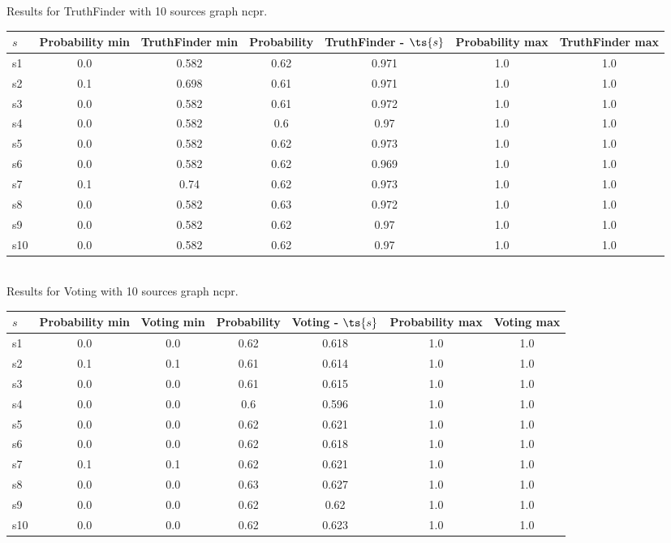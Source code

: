 \documentclass{article}
\begin{document}
\noindent Results for TruthFinder with 10 sources graph ncpr.

\noindent\begin{tabular}{|l|c|c|c|c|c|c|}
\hline
$s$& Probability min & TruthFinder min & Probability & TruthFinder - $\ts{s}$ & Probability max & TruthFinder max\\
\hline
s1 &0.0 & 0.582 & 0.62 & 0.971 & 1.0 & 1.0\\
\hline
s2 &0.1 & 0.698 & 0.61 & 0.971 & 1.0 & 1.0\\
\hline
s3 &0.0 & 0.582 & 0.61 & 0.972 & 1.0 & 1.0\\
\hline
s4 &0.0 & 0.582 & 0.6 & 0.97 & 1.0 & 1.0\\
\hline
s5 &0.0 & 0.582 & 0.62 & 0.973 & 1.0 & 1.0\\
\hline
s6 &0.0 & 0.582 & 0.62 & 0.969 & 1.0 & 1.0\\
\hline
s7 &0.1 & 0.74 & 0.62 & 0.973 & 1.0 & 1.0\\
\hline
s8 &0.0 & 0.582 & 0.63 & 0.972 & 1.0 & 1.0\\
\hline
s9 &0.0 & 0.582 & 0.62 & 0.97 & 1.0 & 1.0\\
\hline
s10 &0.0 & 0.582 & 0.62 & 0.97 & 1.0 & 1.0\\
\hline
\end{tabular}\\

\noindent Results for Voting with 10 sources graph ncpr.

\noindent\begin{tabular}{|l|c|c|c|c|c|c|}
\hline
$s$& Probability min & Voting min & Probability & Voting - $\ts{s}$ & Probability max & Voting max\\
\hline
s1 &0.0 & 0.0 & 0.62 & 0.618 & 1.0 & 1.0\\
\hline
s2 &0.1 & 0.1 & 0.61 & 0.614 & 1.0 & 1.0\\
\hline
s3 &0.0 & 0.0 & 0.61 & 0.615 & 1.0 & 1.0\\
\hline
s4 &0.0 & 0.0 & 0.6 & 0.596 & 1.0 & 1.0\\
\hline
s5 &0.0 & 0.0 & 0.62 & 0.621 & 1.0 & 1.0\\
\hline
s6 &0.0 & 0.0 & 0.62 & 0.618 & 1.0 & 1.0\\
\hline
s7 &0.1 & 0.1 & 0.62 & 0.621 & 1.0 & 1.0\\
\hline
s8 &0.0 & 0.0 & 0.63 & 0.627 & 1.0 & 1.0\\
\hline
s9 &0.0 & 0.0 & 0.62 & 0.62 & 1.0 & 1.0\\
\hline
s10 &0.0 & 0.0 & 0.62 & 0.623 & 1.0 & 1.0\\
\hline
\end{tabular}\\
\end{document}
